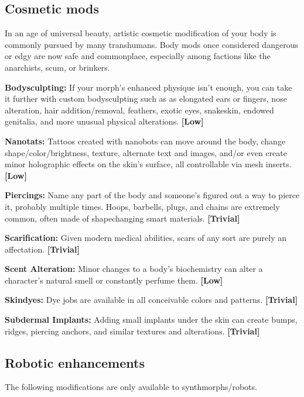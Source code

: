 \subsection{Cosmetic mods} \label{sec:cosmetic-mods} 

In an age of universal beauty, artistic cosmetic modification of your body is commonly pursued by many transhumans. Body mods once considered dangerous or edgy are now safe and commonplace, especially among factions like the anarchists, scum, or brinkers. 

\textbf{Bodysculpting:} If your morph’s enhanced physique isn’t enough, you can take it further with custom bodysculpting such as as elongated ears or fingers, nose alteration, hair addition/removal, feathers, exotic eyes, snakeskin, endowed genitalia, and more unusual physical alterations. \textbf{[Low]} 

\textbf{Nanotats:} Tattoos created with nanobots can move around the body, change shape/color/brightness, texture, alternate text and images, and/or even create minor holographic effects on the skin’s surface, all controllable via mesh inserts. \textbf{[Low]} 

\textbf{Piercings:} Name any part of the body and someone’s figured out a way to pierce it, probably multiple times. Hoops, barbells, plugs, and chains are extremely common, often made of shapechanging smart materials. \textbf{[Trivial]} 

\textbf{Scarification:} Given modern medical abilities, scars of any sort are purely an affectation. \textbf{[Trivial]} 

\textbf{Scent Alteration:} Minor changes to a body’s biochemistry can alter a character’s natural smell or constantly perfume them. \textbf{[Low]} 

\textbf{Skindyes:} Dye jobs are available in all conceivable colors and patterns. \textbf{[Trivial]} 

\textbf{Subdermal Implants:} Adding small implants under the skin can create bumps, ridges, piercing anchors, and similar textures and alterations. \textbf{[Trivial]} 



\subsection{Robotic enhancements} \label{sec:robotic-enhancements} 

The following modifications are only available to synthmorphs/robots. 

